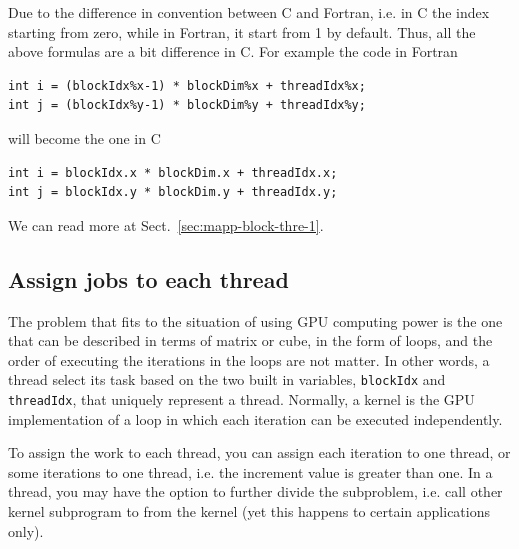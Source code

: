 Due to the difference in convention between C and Fortran, i.e. in C
the index starting from zero, while in Fortran, it start from 1 by
default. Thus, all the above formulas are a bit difference in C. For
example the code in Fortran
\begin{lstlisting}
int i = (blockIdx%x-1) * blockDim%x + threadIdx%x;
int j = (blockIdx%y-1) * blockDim%y + threadIdx%y;
\end{lstlisting}
will become the one in C
\begin{lstlisting}
int i = blockIdx.x * blockDim.x + threadIdx.x;
int j = blockIdx.y * blockDim.y + threadIdx.y;
\end{lstlisting}
We can read more at Sect.~\ref{sec:mapp-block-thre-1}.

\subsection{Assign jobs to each thread}
\label{sec:assign-jobs-each}

The problem that fits to the situation of using GPU computing power is
the one that can be described in terms of matrix or cube, in the form
of loops, and the order of executing the iterations in the loops are
not matter. In other words, a thread select its task based on the two
built in variables, \verb!blockIdx! and \verb!threadIdx!, that
uniquely represent a thread. Normally, a kernel is the GPU
implementation of a loop in which each iteration can be executed
independently.

To assign the work to each thread, you can assign each iteration to
one thread, or some iterations to one thread, i.e. the increment value
is greater than one. In a thread, you may have the option to further
divide the subproblem, i.e. call other kernel subprogram to from the
kernel (yet this happens to certain applications only).

